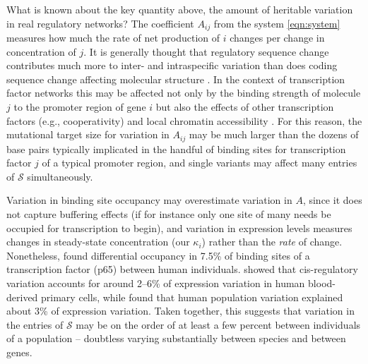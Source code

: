 \documentclass{article}
\newcommand{\plr}[1]{\todo[color=blue!25]{#1}}
\newcommand{\plr}[1]{{\color{blue}\it #1}}
\newcommand{\1}{\mathbbm{1}}
\newcommand{\Sys}{\mathcal{S}}
\begin{document}
What is known about the key quantity above, the amount of heritable variation in real regulatory networks?
The coefficient $A_{ij}$ from the system \eqref{eqn:system} measures how much the rate of net production of $i$ changes
per change in concentration of $j$.
It is generally thought that regulatory sequence change contributes much more to inter- and intraspecific variation
than does coding sequence change affecting molecular structure \citep{schmidt2010vertebrate}.
In the context of transcription factor networks this may be affected 
not only by the binding strength of molecule $j$ to the promoter region of gene $i$
but also the effects of other transcription factors (e.g., cooperativity)
and local chromatin accessibility \citep{stefflova2013cooperativity}.
For this reason, 
the mutational target size for variation in $A_{ij}$ may be much larger than the dozens of base pairs
typically implicated in the handful of binding sites for transcription factor $j$ of a typical promoter region,
and single variants may affect many entries of $\Sys$ simultaneously.

Variation in binding site occupancy may overestimate variation in $A$,
since it does not capture buffering effects (if for instance only one site of many needs be occupied for transcription to begin),
and variation in expression levels measures changes in steady-state concentration (our $\kappa_i$) rather than the \emph{rate} of change.
Nonetheless,
\citet{kasowski2010variation} found differential occupancy in 7.5\%
of binding sites of a transcription factor (p65) between human individuals.
\citet{verlaan2009targeted} showed that cis-regulatory variation
accounts for around 2--6\% of expression variation in human blood-derived primary cells,
while \citep{lappalainen2013transcriptome} found that human population variation 
explained about 3\% of expression variation.
Taken together, this suggests that variation in the entries of $\Sys$
may be on the order of at least a few percent between individuals of a population --
doubtless varying substantially between species and between genes.
\end{document}
